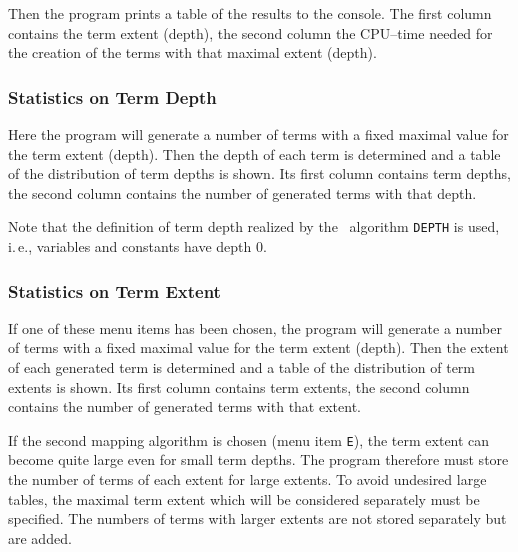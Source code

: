 Then the program prints a table of the results to the console. The
first column contains the term extent (depth), the second column the
CPU--time needed for the creation of the terms with that maximal
extent (depth).

\subsubsection{Statistics on Term Depth}
Here the program will generate a number of terms with a fixed maximal
value for the term extent (depth).  Then the depth of each term is
determined and a table of the distribution of term depths is shown. Its
first column contains term depths, the second column contains the
number of generated terms with that depth.

Note that the definition of term depth realized by the \redux\ algorithm
{\tt DEPTH} is used, i.\,e., variables and constants have depth 0.

\subsubsection{Statistics on Term Extent}
If one of these menu items has been chosen, the program will generate
a number of terms with a fixed maximal value for the term extent
(depth).  Then the extent of each generated term is determined and a
table of the distribution of term extents is shown. Its first
column contains term extents, the second column contains the number of
generated terms with that extent.

If the second mapping algorithm is chosen (menu item {\tt E}), the term
extent can become quite large even for small term depths.  The program
therefore must store the number of terms of each extent for large
extents.  To avoid undesired large tables, the maximal
term extent which will be considered separately must be specified. The
numbers of terms with larger extents are not stored separately but are
added.


